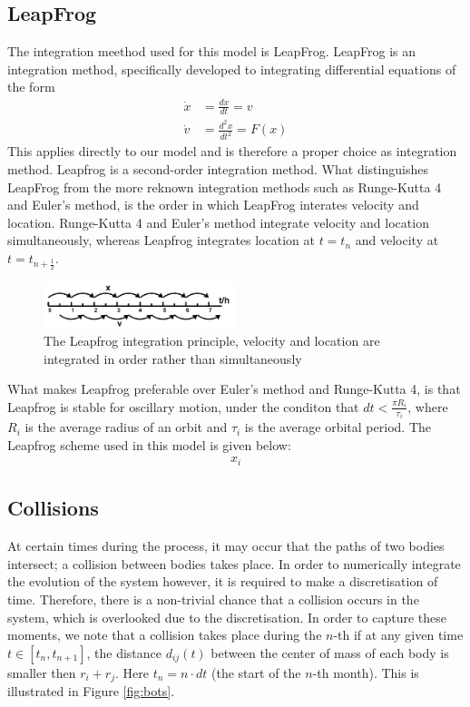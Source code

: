 \subsection{LeapFrog}
The integration meethod used for this model is LeapFrog. LeapFrog is an integration method, specifically developed to integrating differential equations of the form 
\begin{align*}
	\dot{x}&=\frac{dx}{dt}=v\\
	\dot{v}&=\frac{d^2x}{dt^2}=F(x)
\end{align*}
This applies directly to our model and is therefore a proper choice as integration method. Leapfrog is a second-order integration method. 
What distinguishes LeapFrog from the more reknown integration methods such as Runge-Kutta 4 and Euler's method, is the order in which LeapFrog interates velocity and location. 
Runge-Kutta 4 and Euler's method integrate velocity and location simultaneously, whereas Leapfrog integrates location at \(t=t_n\) and velocity at \(t=t_{n+\frac{1}{2}}\). 
\begin{figure}[H]
  \centering
  \includegraphics[width=0.5\textwidth]{Leapfrog}
  \caption{The Leapfrog integration principle, velocity and location are integrated in order rather than simultaneously}
  \label{fig:leapfrog}
\end{figure}
What makes Leapfrog preferable over Euler's method and Runge-Kutta 4, is that Leapfrog is stable for oscillary motion, under the conditon that \(dt<\frac{\pi R_i}{\tau_i}\), where \(R_i\) is the average radius of an orbit and \(\tau_i\) is the average orbital period\cite{LFcond}. 
The Leapfrog scheme used in this model is given below:
\begin{align*}
x_i
\end{align*}


\subsection{Collisions}
At certain times during the process, it may occur that the paths of two bodies intersect; a collision between bodies takes place. In order to numerically integrate the evolution of the system however, it is required to make a discretisation of time.
 Therefore, there is a non-trivial chance that a collision occurs in the system, which is overlooked due to the discretisation.
 In order to capture these moments, we note that a collision takes place during the \(n\)-th if at any given time \(t\in[t_{n},t_{n+1}]\), the distance \(d_{ij}(t)\) between the center of mass of each body is smaller then \(r_i+r_j\). 
 Here \(t_n=n\cdot dt\) (the start of the \(n\)-th month). This is illustrated in Figure \ref{fig:bots}.
 
